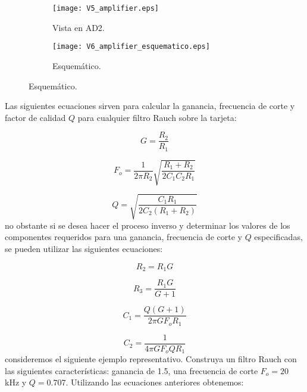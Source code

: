 	\begin{figure}[!ht]
	\centering   
	\caption{Diferentes representaciones de filtro Rauch.}
	\label{fig:filtro_rauch}
		\begin{subfigure}{0.3\textwidth}
			\centering   
			\texttt{[image: V5\_amplifier.eps]}
			\caption{Vista en AD2.}
			\label{fig:V5_amplifier}
		\end{subfigure}
		\begin{subfigure}{0.65\textwidth}
			\centering   
			\texttt{[image: V6\_amplifier\_esquematico.eps]}
			\caption{Esquemático.}
			\label{fig:V6_amplifier_esquematico}
		\end{subfigure}
	\end{figure}

	Las siguientes ecuaciones sirven para calcular la ganancia, frecuencia de corte y factor de calidad $Q$ para cualquier filtro Rauch sobre la tarjeta:
	
	\begin{equation}
		G = \frac{R_{2}}{R_{1}}
	\end{equation}
	
	\begin{equation}
		F_{o} = \frac{1}{2 \pi R_{2}} \sqrt{ \frac{R_{1}+ R_{2} }{2 C_{1} C_{2} R_{1}}}
	\end{equation}
	
	\begin{equation}
		Q = \sqrt{\frac{C_{1} R_{1}}{2 C_{2} (R_{1} + R_{2})}}
	\end{equation}
	no obstante si se desea hacer el proceso inverso y determinar los valores de los componentes requeridos para una ganancia, frecuencia de corte y $Q$ especificadas, se pueden utilizar las siguientes ecuaciones: 
	
	\begin{equation}
		R_{2} = R_{1} G
	\end{equation}
	
	\begin{equation}
		R_{3} = \frac{R_{1} G}{G + 1}
	\end{equation}
	
	\begin{equation}
		C_{1} = \frac{Q (G + 1)}{2 \pi G F_{o} R_{1}}
	\end{equation}
	
	\begin{equation}
		C_{2} = \frac{1}{4 \pi G F_{o} Q R_{1}}
	\end{equation}
	consideremos el siguiente ejemplo representativo. Construya un filtro Rauch con las siguientes características: ganancia de 1.5, una frecuencia de corte $F_{o} = 20$ kHz y $Q = 0.707$. Utilizando las ecuaciones anteriores obtenemos:
	
